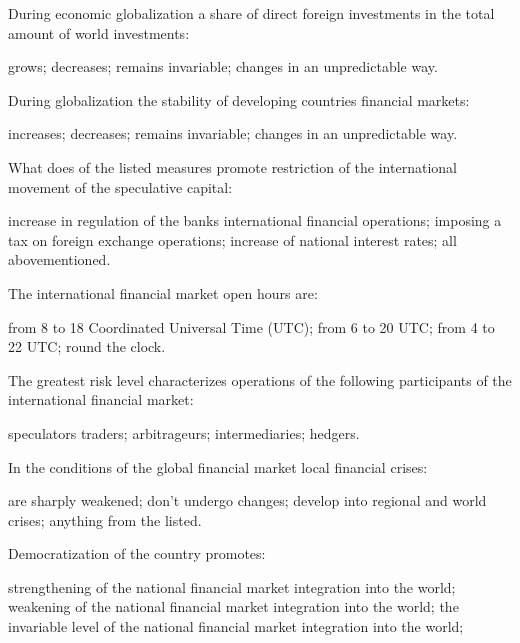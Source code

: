 \documentclass[12pt, table]{exam}
\begin{document}
\begin{questions}
\begin{multicols}{2}
\setlength{\columnsep}{1cm}

\question During economic globalization a share of direct foreign investments in the total amount of world investments:
	 \begin{choices}
	 \CC grows;
	 \choice decreases;
	 \choice remains invariable;
	 \choice changes in an unpredictable way.
	 \end{choices}
\question During globalization the stability of developing countries financial markets:
	 \begin{choices}
	 \choice increases;
	 \CC decreases;
	 \choice remains invariable;
	 \choice changes in an unpredictable way.
	 \end{choices}
\question What does of the listed measures promote restriction of the international movement of the speculative capital:
	 \begin{choices}
	 \choice increase in regulation of the banks international financial operations;
	 \choice imposing a tax on foreign exchange operations;
	 \choice increase of national interest rates;
	 \CC all abovementioned.
	 \end{choices}
\question The international financial market open hours are:
	 \begin{choices}
	 \choice from 8 to 18 Coordinated Universal Time (UTC);
	 \choice from 6 to 20 UTC;
	 \choice from 4 to 22 UTC;
	 \CC round the clock.
	 \end{choices}
\question The greatest risk level characterizes operations of the following participants of the international financial market:
	 \begin{choices}
	 \CC speculators traders;
	 \choice arbitrageurs;
	 \choice intermediaries;
	 \choice hedgers.
	 \end{choices}
\question In the conditions of the global financial market local financial crises:
	 \begin{choices}
	 \choice are sharply weakened;
	 \choice don't undergo changes;
	 \CC develop into regional and world crises;
	 \choice anything from the listed.
	 \end{choices}
\question Democratization of the country promotes:
	 \begin{choices}
	 \CC strengthening of the national financial market integration into the world;
	 \choice weakening of the national financial market integration into the world;
	 \choice the invariable level of the national financial market integration into the world;

\end{choices}
\end{multicols}
\end{questions}
\end{document}
